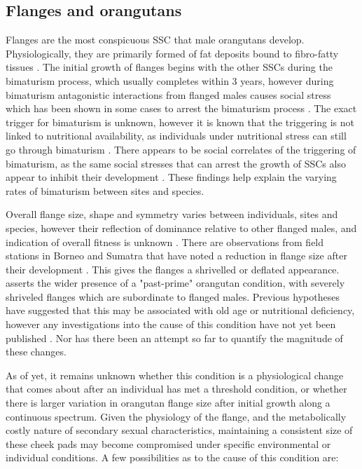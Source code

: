 \subsection{Flanges and orangutans}

Flanges are the most conspicuous SSC that male orangutans develop. Physiologically, they are primarily formed of fat deposits bound to fibro-fatty tissues \citep{Straus.1942}. The initial growth of flanges begins with the other SSCs during the bimaturism process, which usually completes within 3 years, however during bimaturism antagonistic interactions from flanged males causes social stress which has been shown in some cases to arrest the bimaturism process \citep{Prasetyo.2021}. The exact trigger for bimaturism is unknown, however it is known that the triggering is not linked to nutritional availability, as individuals under nutritional stress can still go through bimaturism \citep{Prasetyo.2021}. There appears to be social correlates of the triggering of bimaturism, as the same social stresses that can arrest the growth of SSCs also appear to inhibit their development \citep{Dunkel.2013xnm}. These findings help explain the varying rates of bimaturism between sites and species. 

Overall flange size, shape and symmetry varies between individuals, sites and species, however their reflection of dominance relative to other flanged males, and indication of overall fitness is unknown \citep{Prasetyo.2021, Wich.2019}. There are observations from field stations in Borneo and Sumatra that have noted a reduction in flange size after their development \citep{Knott.2009b, Dunkel.2013}. This gives the flanges a shrivelled or deflated appearance. \citet{Knott.2009b} asserts the wider presence of a "past-prime" orangutan condition, with severely shriveled flanges which are subordinate to flanged males. 
Previous hypotheses have suggested that this may be associated with old age or nutritional deficiency, however any investigations into the cause of this condition have not yet been published \citep{Galdikas.1978,Knott.2008}. Nor has there been an attempt so far to quantify the magnitude of these changes.

As of yet, it remains unknown whether this condition is a physiological change that comes about after an individual has met a threshold condition, or whether there is larger variation in orangutan flange size after initial growth along a continuous spectrum. Given the physiology of the flange, and the metabolically costly nature of secondary sexual characteristics, maintaining a consistent size of these cheek pads may become compromised under specific environmental or individual conditions. A few possibilities as to the cause of this condition are:

